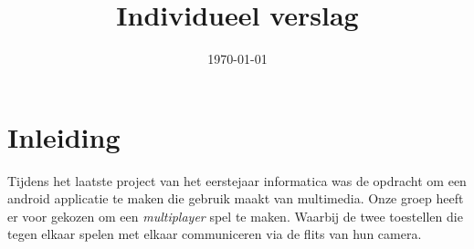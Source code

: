 \documentclass{uva-inf-article}
\title{Individueel verslag}
\date{\today}
\begin{document}
\maketitle




\section{Inleiding}
Tijdens het laatste project van het eerstejaar informatica was de opdracht om
een android applicatie te maken die gebruik maakt van multimedia. Onze groep heeft er
voor gekozen om een \textit{multiplayer} spel te maken. Waarbij de twee toestellen
die tegen elkaar spelen met elkaar communiceren via de flits van hun camera.
\end{document}
